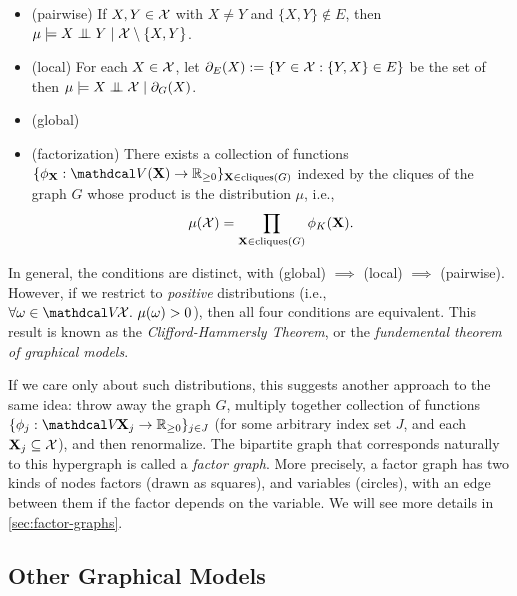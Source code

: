 \begin{itemize}[nosep]
    \item (pairwise) 
        If $X,Y \in \mathcal X$ with $X \ne Y$ and $\{X, Y\} \notin E$, then 
        $
        \mu \models
            X \mathrel{\perp\mspace{-10mu}\perp} Y \mid \mathcal X \setminus \{X, Y\}$.  
    \item (local) 
        For each $X \in \mathcal X$, let $\partial_E(X) := \{ Y \in \mathcal X : \{Y,X\} \in E \}$ be the set of 
        then $
            \mu \models
        X \mathrel{\perp\mspace{-10mu}\perp} \mathcal X \mid \partial_G(X)$.  
    \item (global)
    \item (factorization) 
        There exists a collection of functions 
        $\{ \phi_{\mat X} : \V(\mat X)\to \mathbb R_{\ge 0} \}_{\mat X \in \mathrm{cliques}(G)}$
        indexed by the cliques of the graph $G$
        whose product is the distribution $\mu$,
        i.e.,
        \[
            \mu(\mathcal X) = \prod_{\mathbf X \in \mathrm{cliques}(G)} \phi_K(\mathbf X).
        \]
\end{itemize}

In general, the conditions are distinct, with (global) $\implies$ (local) $\implies$ (pairwise). 
However, if we restrict to \emph{positive} distributions (i.e., $\forall \omega \in \V\!\X.~\mu(\omega) > 0 $), then all four conditions are equivalent.
This result is
known as the \emph{Clifford-Hammersly Theorem}, or the \emph{fundemental theorem of graphical models}. 

If we care only about such distributions, this suggests another approach to the same idea: throw away the graph $G$, multiply together collection of functions $\{ \phi_{j} : \V \! \mat X_{j} \to \mathbb R_{\ge 0} \}_{j \in J}$ (for some arbitrary index set $J$, and each $\mathbf X_j \subseteq \mathcal X$), and then renormalize. 
%
The bipartite graph that corresponds naturally to this hypergraph is called a \emph{factor graph}. 
More precisely, a factor graph has two kinds of nodes factors (drawn as squares), and variables (circles), with an edge between them if the factor depends on the variable.
We will see more details in \cref{sec:factor-graphs}.


\subsection{Other Graphical Models}
    \label{sec:prelim-other-pgms}

